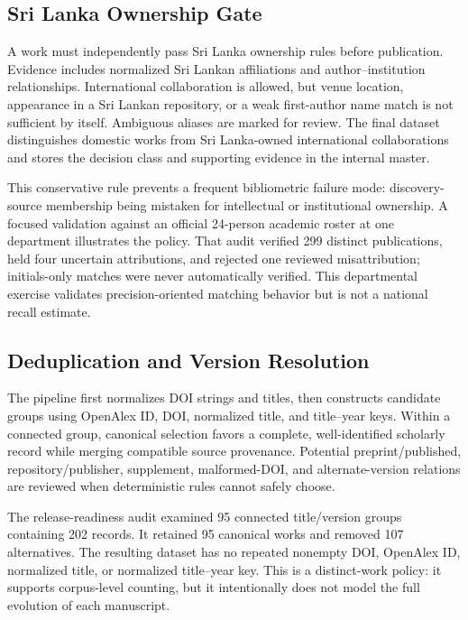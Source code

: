 \documentclass[conference]{IEEEtran}
\begin{document}
\subsection{Sri Lanka Ownership Gate}
A work must independently pass Sri Lanka ownership rules before publication. Evidence includes normalized Sri Lankan affiliations and author--institution relationships. International collaboration is allowed, but venue location, appearance in a Sri Lankan repository, or a weak first-author name match is not sufficient by itself. Ambiguous aliases are marked for review. The final dataset distinguishes domestic works from Sri Lanka-owned international collaborations and stores the decision class and supporting evidence in the internal master.

This conservative rule prevents a frequent bibliometric failure mode: discovery-source membership being mistaken for intellectual or institutional ownership. A focused validation against an official 24-person academic roster at one department illustrates the policy. That audit verified 299 distinct publications, held four uncertain attributions, and rejected one reviewed misattribution; initials-only matches were never automatically verified. This departmental exercise validates precision-oriented matching behavior but is not a national recall estimate.

\subsection{Deduplication and Version Resolution}
The pipeline first normalizes DOI strings and titles, then constructs candidate groups using OpenAlex ID, DOI, normalized title, and title--year keys. Within a connected group, canonical selection favors a complete, well-identified scholarly record while merging compatible source provenance. Potential preprint/published, repository/publisher, supplement, malformed-DOI, and alternate-version relations are reviewed when deterministic rules cannot safely choose.

The release-readiness audit examined 95 connected title/version groups containing 202 records. It retained 95 canonical works and removed 107 alternatives. The resulting dataset has no repeated nonempty DOI, OpenAlex ID, normalized title, or normalized title--year key. This is a distinct-work policy: it supports corpus-level counting, but it intentionally does not model the full evolution of each manuscript.
\end{document}
